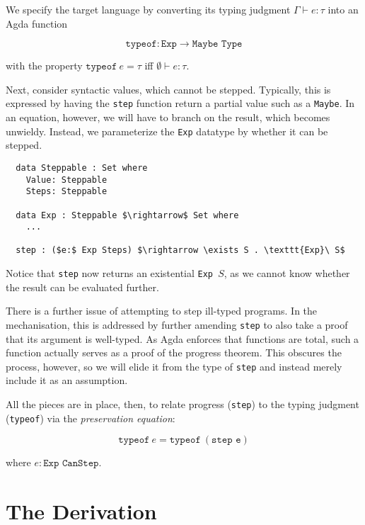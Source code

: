 \documentclass[manuscript,screen,sigplan]{acmart}
\begin{document}
We specify the target language by converting its typing judgment $\Gamma
\vdash e : \tau$ into an Agda function

\begin{equation*}
  \texttt{typeof} : \texttt{Exp} \rightarrow \texttt{Maybe Type}
\end{equation*}

with the property $\texttt{typeof}\ e = \tau$ iff $\emptyset \vdash e : \tau$.

Next, consider syntactic values, which cannot be stepped. Typically, this is
expressed by having the \texttt{step} function return a partial value such as a
\texttt{Maybe}. In an equation, however, we will have to branch on the result,
which becomes unwieldy. Instead, we parameterize the \texttt{Exp} datatype by
whether it can be stepped.

\begin{lstlisting}
  data Steppable : Set where
    Value: Steppable
    Steps: Steppable

  data Exp : Steppable $\rightarrow$ Set where
    ...

  step : ($e:$ Exp Steps) $\rightarrow \exists S . \texttt{Exp}\ S$
\end{lstlisting}

Notice that \texttt{step} now returns an existential \texttt{Exp }$S$, as we
cannot know whether the result can be evaluated further.

There is a further issue of attempting to step ill-typed programs. In the
mechanisation, this is addressed by further amending \texttt{step} to also take
a proof that its argument is well-typed. As Agda enforces that functions are
total, such a function actually serves as a proof of the progress theorem.
This obscures the process, however, so we will elide it from the type of
\texttt{step} and instead merely include it as an assumption.

All the pieces are
in place, then, to relate progress (\texttt{step}) to the typing judgment
(\texttt{typeof}) via the \emph{preservation equation}:

\begin{equation}\label{eq:preservation}
  \texttt{typeof}\ e = \texttt{typeof}\ (\texttt{step e})
\end{equation}

where $e : \texttt{Exp CanStep}$.

\section{The Derivation}
\end{document}
